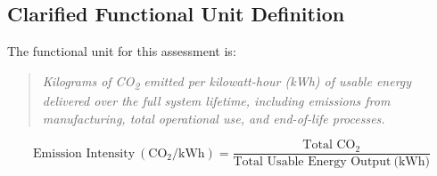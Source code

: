 \documentclass{article}
\begin{document}
\subsection*{Clarified Functional Unit Definition}

The functional unit for this assessment is:  
\begin{quote}
	\textit{Kilograms of CO\textsubscript{2} emitted per kilowatt-hour (kWh) of usable energy delivered over the full system lifetime, including emissions from manufacturing, total operational use, and end-of-life processes.}
\end{quote}
\vspace{1em}
\begin{equation}
\text{Emission Intensity}\ (\text{CO}_2/\text{kWh}) =\frac{\text{Total  CO}_2}{\text{Total Usable Energy Output}\ \text{(kWh)}}
\label{normalco}
\end{equation}
\end{document}
